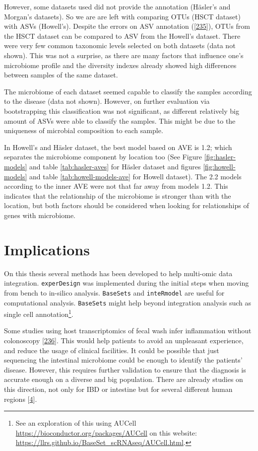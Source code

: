 \documentclass[
  12pt,
  a4paper,
  twoside,
  openright]{book}
\begin{document}
However, some datasets used did not provide the annotation (Häsler's and Morgan's datasets).
So we are are left with comparing OTUs (HSCT dataset) with ASVs (Howell's).
Despite the errors on ASV annotation ({[}\protect\hyperlink{ref-edgar2018}{235}{]}), OTUs from the HSCT dataset can be compared to ASV from the Howell's dataset.
There were very few common taxonomic levels selected on both datasets (data not shown).
This was not a surprise, as there are many factors that influence one's microbiome profile and the diversity indexes already showed high differences between samples of the same dataset.

The microbiome of each dataset seemed capable to classify the samples according to the disease (data not shown).
However, on further evaluation via bootstrapping this classification was not significant, as different relatively big amount of ASVs were able to classify the samples.
This might be due to the uniqueness of microbial composition to each sample.

In Howell's and Häsler dataset, the best model based on AVE is 1.2; which separates the microbiome component by location too (See Figure \ref{fig:hasler-models} and table \ref{tab:hasler-aves} for Häsler dataset and figures \ref{fig:howell-models} and table \ref{tab:howell-models-ave} for Howell dataset).
The 2.2 models according to the inner AVE were not that far away from models 1.2.
This indicates that the relationship of the microbiome is stronger than with the location, but both factors should be considered when looking for relationships of genes with microbiome.

\hypertarget{implications}{%
\section{Implications}\label{implications}}

On this thesis several methods has been developed to help multi-omic data integration.
\texttt{experDesign} was implemented during the initial steps when moving from bench to in-silico analysis.
\texttt{BaseSets} and \texttt{inteRmodel} are useful for computational analysis.
\texttt{BaseSets} might help beyond integration analysis such as single cell annotation\footnote{See an exploration of this using AUCell \url{https://bioconductor.org/packages/AUCell} on this website: \url{https://llrs.github.io/BaseSet_scRNAseq/AUCell.html}.}.

Some studies using host transcriptomics of fecal wash infer inflammation without colonoscopy {[}\protect\hyperlink{ref-ungar2022}{236}{]}.
This would help patients to avoid an unpleasant experience, and reduce the usage of clinical facilities.
It could be possible that just sequencing the intestinal microbiome could be enough to identify the patients' disease.
However, this requires further validation to ensure that the diagnosis is accurate enough on a diverse and big population.
There are already studies on this direction, not only for IBD or intestine but for several different human regions {[}\protect\hyperlink{ref-humanmicrobiomeprojectconsortium2012}{4}{]}.
\end{document}
